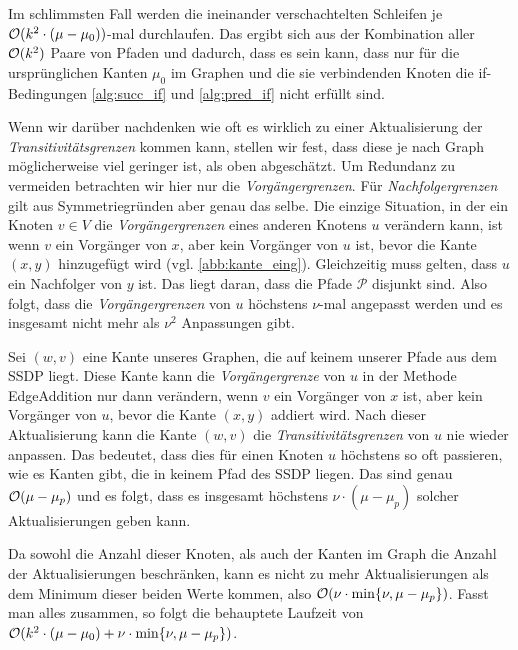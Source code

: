 \begin{beweis}
	Im schlimmsten Fall werden die ineinander verschachtelten Schleifen je $\mathcal{O}(k^2 \cdot (\mu - \mu_0))$-mal durchlaufen. Das ergibt sich aus der Kombination aller $\mathcal{O}(k^2)$ Paare von Pfaden und dadurch, dass es sein kann, dass nur für die ursprünglichen Kanten $\mu_0$ im Graphen und die sie verbindenden Knoten die if-Bedingungen \ref{alg:succ_if} und \ref{alg:pred_if} nicht erfüllt sind. 
	
	Wenn wir darüber nachdenken wie oft es wirklich zu einer Aktualisierung der \emph{Transitivitätsgrenzen} kommen kann, stellen wir fest, dass diese je nach Graph möglicherweise viel geringer ist, als oben abgeschätzt. Um Redundanz zu vermeiden betrachten wir hier nur die \emph{Vorgängergrenzen}. Für \emph{Nachfolgergrenzen} gilt aus Symmetriegründen aber genau das selbe. Die einzige Situation, in der ein Knoten $v \in V$ die \emph{Vorgängergrenzen} eines anderen Knotens $u$ verändern kann, ist wenn $v$ ein Vorgänger von $x$, aber kein Vorgänger von $u$ ist, bevor die Kante $(x,y)$ hinzugefügt wird (vgl. \ref{abb:kante_eing}). Gleichzeitig muss gelten, dass $u$ ein Nachfolger von $y$ ist. Das liegt daran, dass die Pfade $\mathcal{P}$ disjunkt sind. Also folgt, dass die \emph{Vorgängergrenzen} von $u$ höchstens $\nu$-mal angepasst werden und es insgesamt nicht mehr als $\nu^2$ Anpassungen gibt. 

	Sei $(w,v)$ eine Kante unseres Graphen, die auf keinem unserer Pfade aus dem SSDP liegt. Diese Kante kann die \emph{Vorgängergrenze} von $u$ in der Methode \textrm{EdgeAddition} nur dann verändern, wenn $v$ ein Vorgänger von $x$ ist, aber kein Vorgänger von $u$, bevor die Kante $(x,y)$ addiert wird. Nach dieser Aktualisierung kann die Kante $(w,v)$ die \emph{Transitivitätsgrenzen} von $u$ nie wieder anpassen. Das bedeutet, dass dies für einen Knoten $u$ höchstens so oft passieren, wie es Kanten gibt, die in keinem Pfad des SSDP liegen. Das sind genau $\mathcal{O}(\mu - \mu_p)$ und es folgt, dass es insgesamt höchstens $\nu \cdot (\mu - \mu_p)$ solcher Aktualisierungen geben kann.
	
	Da sowohl die Anzahl dieser Knoten, als auch der Kanten im Graph die Anzahl der Aktualisierungen beschränken, kann es nicht zu mehr Aktualisierungen als dem Minimum dieser beiden Werte kommen, also $\mathcal{O}(\nu \cdot \min\{\nu, \mu - \mu_p\})$. Fasst man alles zusammen, so folgt die behauptete Laufzeit von $\mathcal{O}(k^2 \cdot (\mu - \mu_0) + \nu \cdot \min\{\nu, \mu - \mu_p\})$.
\end{beweis}

